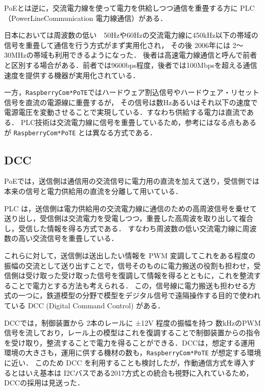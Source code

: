 PoEとは逆に，交流電力線を使って電力を供給しつつ通信を重畳する方に PLC（PowerLineCommunication 電力線通信）がある．


日本においては周波数の低い　50Hzや60Hzの交流電力線に450kHz以下の帯域の信号を重畳して通信を行う方式がまず実用化され，
その後 2006年には 2〜30MHzの帯域も利用できるようになった．
後者は高速電力線通信と呼んで前者と区別する場合がある．前者では9600bps程度，後者では100Mbpsを超える通信速度を提供する機器が実用化されている．

一方，{\tt Raspberry\-Com*PoTE}ではハードウェア割込信号やハードウェア・リセット信号を直流の電源線に重畳するが，
その信号は数Hzあるいはそれ以下の速度で電源電圧を変動させることで実現している．すなわち供給する電力は直流である．
PLC技術は交流電力線に信号を重畳しているため，参考にはなる点もあるが {\tt Raspberry\-Com*PoTE} とは異なる方式である．


\subsection{DCC}
\vspace{-0.5zh}



PoEでは，送信側は通信用の交流信号に電力用の直流を加えて送り，受信側では本来の信号と電力供給用の直流を分離して用いている．

PLC は，送信側は電力供給用の交流電力線に通信のための高周波信号を乗せて送り出し，受信側は交流電力を受電しつつ，重畳した高周波を取り出して複合し，受信した情報を得る方式である．
すなわち周波数の低い交流電力線に周波数の高い交流信号を重畳している．

これらに対して，送信側は送出したい情報を PWM 変調してこれをある程度の振幅の交流として送り出すことで，信号そのものに電力搬送の役割も担わせ，受信側は受け取った受け取った信号を復調して情報を得るとともに，これを整流することで電力とする方法も考えられる．
この，信号線に電力搬送も担わせる方式の一つに，鉄道模型の分野で模型をデジタル信号で遠隔操作する目的で使われている DCC (Digital Command Control) がある\cite{misc:DCC}．


DCCでは，制御装置から 2本のレールに ±12V 程度の振幅を持つ 数kHzのPWM信号を流しており，レール上の模型はこれを復調することで制御装置からの指令を受け取り，整流することで電力を得ることができる．DCCは，想定する運用環境の大きさも，運用に供する機材の数も，{\tt Raspberry\-Com*PoTE} が想定する環境に近い．
このため DCC を利用することも検討したが，作動通信方式を導入するとはいえ基本は I2Cバスである2017方式との統合も視野に入れているため，DCCの採用は見送った．


